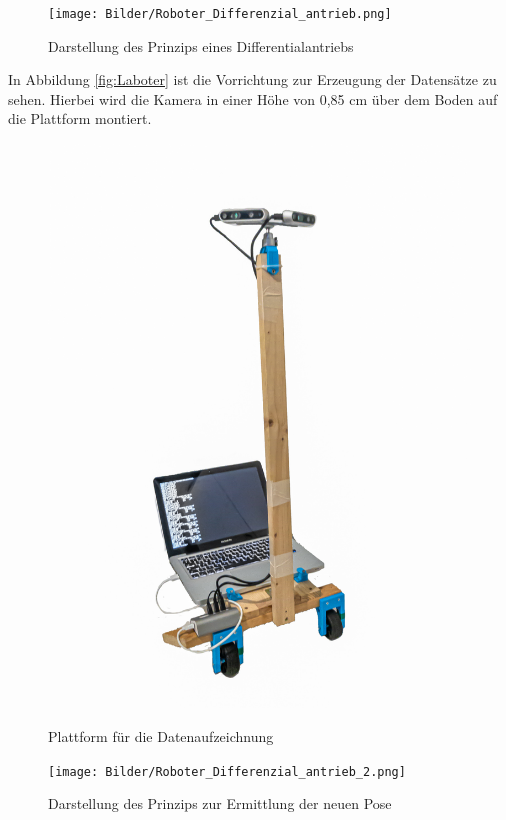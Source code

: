 \begin{figure}
	\centering
	\texttt{[image: Bilder/Roboter\_Differenzial\_antrieb.png]}
	\caption{Darstellung des Prinzips eines Differentialantriebs}
	\label{fig:Differentialantrieb}
\end{figure}

In Abbildung \ref{fig:Laboter} ist die Vorrichtung zur Erzeugung der Datensätze zu sehen. Hierbei wird die Kamera in einer Höhe von 0,85 cm über dem Boden auf die Plattform montiert.

\begin{figure}
	\centering
	\begin {minipage}[t]{0.3\linewidth}
	\centering
	\includegraphics[width=\linewidth]{Bilder/laboter.jpg}
	\caption{Plattform für die Datenaufzeichnung }
	\label{fig:Laboter}
\end{minipage}
\hfill
 \begin{minipage}[t]{0.6\linewidth}
	\centering
	\texttt{[image: Bilder/Roboter\_Differenzial\_antrieb\_2.png]}
	\caption{Darstellung des Prinzips zur Ermittlung der neuen Pose }
	\label{fig:Odoemtrie}
\end{minipage}
\end{figure}

